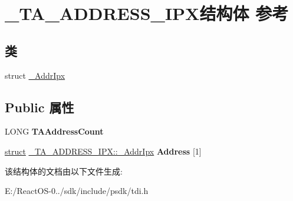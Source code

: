 \hypertarget{struct___t_a___a_d_d_r_e_s_s___i_p_x}{}\section{\+\_\+\+T\+A\+\_\+\+A\+D\+D\+R\+E\+S\+S\+\_\+\+I\+P\+X结构体 参考}
\label{struct___t_a___a_d_d_r_e_s_s___i_p_x}
\subsection*{类}
\begin{DoxyCompactItemize}
\item 
struct \hyperlink{struct___t_a___a_d_d_r_e_s_s___i_p_x_1_1___addr_ipx}{\+\_\+\+Addr\+Ipx}
\end{DoxyCompactItemize}
\subsection*{Public 属性}
\begin{DoxyCompactItemize}
\item 
\mbox{\label{struct___t_a___a_d_d_r_e_s_s___i_p_x_ae33e550b74639b939d99aa0e8979384c}} 
L\+O\+NG {\bfseries T\+A\+Address\+Count}
\item 
\mbox{\label{struct___t_a___a_d_d_r_e_s_s___i_p_x_ab02458520a81541ba274ba7c43831f69}} 
\hyperlink{interfacestruct}{struct} \hyperlink{struct___t_a___a_d_d_r_e_s_s___i_p_x_1_1___addr_ipx}{\+\_\+\+T\+A\+\_\+\+A\+D\+D\+R\+E\+S\+S\+\_\+\+I\+P\+X\+::\+\_\+\+Addr\+Ipx} {\bfseries Address} \mbox{[}1\mbox{]}
\end{DoxyCompactItemize}


该结构体的文档由以下文件生成\+:\begin{DoxyCompactItemize}
\item 
E\+:/\+React\+O\+S-\/0../sdk/include/psdk/tdi.\+h\end{DoxyCompactItemize}
